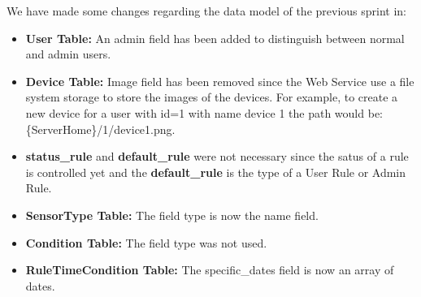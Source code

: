 \documentclass[11pt,a4paper]{article}
\begin{document}
We have made some changes regarding the data model of the previous sprint in:
\begin{itemize}
    \item \textbf{User Table:} An admin field has been added to distinguish between normal and admin users.
    \item \textbf{Device Table:} Image field has been removed since the Web Service use a file system storage to store the images of the devices. For example, to create a new device for a user with id=1 with name device 1 the path would be: \{ServerHome\}/1/device1.png.
    \item \textbf{ status\_rule} and \textbf{default\_rule} were not necessary since the satus of a rule is controlled yet and the \textbf{default\_rule} is the type of a User Rule or Admin Rule.
    \item \textbf{SensorType Table:} The field type is now the name field.
    \item \textbf{Condition Table:} The field type was not used.
    \item \textbf{RuleTimeCondition Table:} The specific\_dates field is now an array of dates.
\end{itemize}
\newpage
\end{document}
